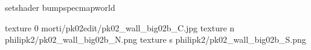 setshader bumpspecmapworld

texture 0 morti/pk02edit/pk02_wall_big02b_C.jpg
texture n philipk2/pk02_wall_big02b_N.png
texture s philipk2/pk02_wall_big02b_S.png

